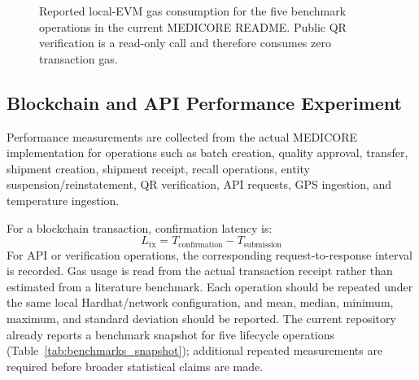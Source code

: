 \documentclass[11pt,a4paper]{article}
\begin{document}
\begin{figure}[htbp]
\centering
{}
\caption{Reported local-EVM gas consumption for the five benchmark operations in the current MEDICORE README. Public QR verification is a read-only call and therefore consumes zero transaction gas.}
\label{fig:gas_barchart}
\end{figure}

\subsection{Blockchain and API Performance Experiment}
Performance measurements are collected from the actual MEDICORE implementation for operations such as batch creation, quality approval, transfer, shipment creation, shipment receipt, recall operations, entity suspension/reinstatement, QR verification, API requests, GPS ingestion, and temperature ingestion.

For a blockchain transaction, confirmation latency is:
\begin{equation}
L_{\text{tx}} = T_{\text{confirmation}} - T_{\text{submission}}
\end{equation}
For API or verification operations, the corresponding request-to-response interval is recorded. Gas usage is read from the actual transaction receipt rather than estimated from a literature benchmark. Each operation should be repeated under the same local Hardhat/network configuration, and mean, median, minimum, maximum, and standard deviation should be reported. The current repository already reports a benchmark snapshot for five lifecycle operations (Table~\ref{tab:benchmarks_snapshot}); additional repeated measurements are required before broader statistical claims are made.
\end{document}
